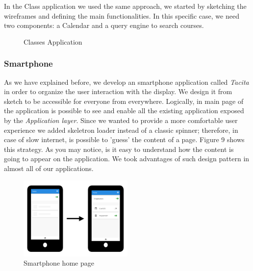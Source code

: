\documentclass[]{usiinfbachelorproject}
\begin{document}
In the Class application we used the same approach, we started by sketching the wireframes and defining the main functionalities. In this specific case, we need two components: a Calendar and a query engine to search courses. 
\begin{figure}[H]
  \centering
  \hfill
    \caption{Classes Application}
\end{figure}
\subsubsection{Smartphone}
As we have explained before, we develop an smartphone application called \emph{Tacita} in order to organize the user interaction with the display. We design it from sketch to be accessible for everyone from everywhere. 
Logically, in main page of the application is possible to see and enable all the existing application exposed by the \emph{Application layer}. Since we wanted to provide a more comfortable user experience we added skeletron loader instead of a classic spinner; therefore, in case of slow internet, is possible to 'guess' the content of a page. Figure 9 shows this strategy. As you may notice, is it easy to understand how the content is going to appear on the application. We took advantages of such design pattern in almost all of our applications.
\begin{figure}[H]
\centering
\includegraphics[width=0.5\textwidth]{./images/smartphone_loading_applications}
\caption{Smartphone home page}
\end{figure}
\end{document}
